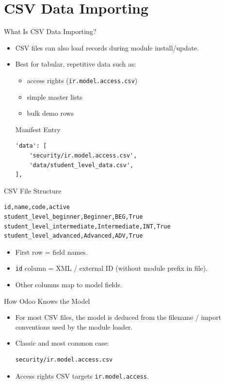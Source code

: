\section{CSV Data Importing}

\begin{frame}[fragile]{What Is CSV Data Importing?}
	\begin{itemize}
		\item CSV files can also load records during module install/update.
		\item Best for tabular, repetitive data such as:
		\begin{itemize}
			\item access rights (\texttt{ir.model.access.csv})
			\item simple master lists
			\item bulk demo rows
		\end{itemize}
\begin{block}{Manifest Entry}
\begin{lstlisting}
'data': [
	'security/ir.model.access.csv',
	'data/student_level_data.csv',
],
\end{lstlisting}
\end{block}
	\end{itemize}
\end{frame}

\begin{frame}[fragile]{CSV File Structure}
\begin{lstlisting}
id,name,code,active
student_level_beginner,Beginner,BEG,True
student_level_intermediate,Intermediate,INT,True
student_level_advanced,Advanced,ADV,True
\end{lstlisting}
	\begin{itemize}
		\item First row = field names.
		\item \texttt{id} column = XML / external ID (without module prefix in file).
		\item Other columns map to model fields.
	\end{itemize}
\end{frame}

\begin{frame}[fragile]{How Odoo Knows the Model}
	\begin{itemize}
		\item For most CSV files, the model is deduced from the filename / import conventions used by the module loader.
		\item Classic and most common case:
\begin{lstlisting}
security/ir.model.access.csv
\end{lstlisting}
		\item Access rights CSV targets \texttt{ir.model.access}.
	\end{itemize}
\end{frame}

